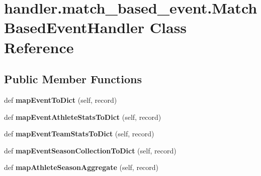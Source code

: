 \hypertarget{classhandler_1_1match__based__event_1_1_match_based_event_handler}{}\section{handler.\+match\+\_\+based\+\_\+event.\+Match\+Based\+Event\+Handler Class Reference}
\label{classhandler_1_1match__based__event_1_1_match_based_event_handler}
\subsection*{Public Member Functions}
\begin{DoxyCompactItemize}
\item 
\mbox{\label{classhandler_1_1match__based__event_1_1_match_based_event_handler_a3ce759233f83c336f6ed6a08101ed2d6}} 
def {\bfseries map\+Event\+To\+Dict} (self, record)
\item 
\mbox{\label{classhandler_1_1match__based__event_1_1_match_based_event_handler_a4abc5672e664593a891e9b3fb72eea46}} 
def {\bfseries map\+Event\+Athlete\+Stats\+To\+Dict} (self, record)
\item 
\mbox{\label{classhandler_1_1match__based__event_1_1_match_based_event_handler_aa35046820aaea6c222d81d4b5737fbac}} 
def {\bfseries map\+Event\+Team\+Stats\+To\+Dict} (self, record)
\item 
\mbox{\label{classhandler_1_1match__based__event_1_1_match_based_event_handler_a63a81190d4a56b0fd85bff212a19db63}} 
def {\bfseries map\+Event\+Season\+Collection\+To\+Dict} (self, record)
\item 
\mbox{\label{classhandler_1_1match__based__event_1_1_match_based_event_handler_aab3019dff5d772c872083d28cba3c141}} 
def {\bfseries map\+Athlete\+Season\+Aggregate} (self, record)
\item 
\mbox{\label{classhandler_1_1match__based__event_1_1_match_based_event_handler_a3bbc33d85346eb768b89155f84eaa84a}} 

\end{DoxyCompactItemize}
